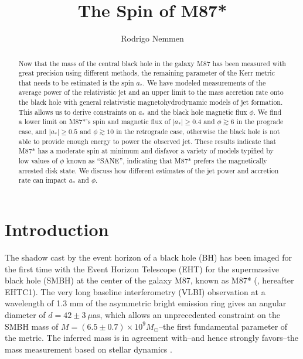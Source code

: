 \documentclass[twocolumn]{aastex62} %
\begin{document}
\title{The Spin of M87*}




\author{Rodrigo Nemmen }
\nocollaboration




\begin{abstract}
Now that the mass of the central black hole in the galaxy M87 has been measured with great precision using different methods, the remaining parameter of the Kerr metric that needs to be estimated is the spin $a_*$. We have modeled measurements of the average power of the relativistic jet and an upper limit to the mass accretion rate onto the black hole with general relativistic magnetohydrodynamic models of jet formation. This allows us to derive constraints on $a_*$ and the black hole magnetic flux $\phi$. We find a lower limit on M87*'s spin and magnetic flux of $|a_*| \geq 0.4$ and $\phi \gtrsim 6$ in the prograde case, and $|a_*| \geq 0.5$ and $\phi \gtrsim 10$ in the retrograde case, otherwise the black hole is not able to provide enough energy to power the observed jet. These results indicate that M87* has a moderate spin at minimum and disfavor a variety of models typified by low values of $\phi$ known as ``SANE'', indicating that M87* prefers the magnetically arrested disk state. We discuss how different estimates of the jet power and accretion rate can impact $a_*$ and $\phi$.
\end{abstract}






\section{Introduction} \label{sec:intro}

The shadow cast by the event horizon of a black hole (BH) has been imaged for the first time with the Event Horizon Telescope (EHT) for the supermassive black hole (SMBH) at the center of the galaxy M87, known as M87* (\citealt{EHTC2019}, hereafter EHTC1). The very long baseline interferometry (VLBI) observation at a wavelength of 1.3 mm of the asymmetric bright emission ring gives an angular diameter of $d=42 \pm 3 \ \mu$as, which allows an unprecedented constraint on the SMBH mass of $M=(6.5 \pm 0.7) \times 10^9 M_\odot$--the first fundamental parameter of the \cite{Kerr1963} metric. The inferred mass is in agreement with--and hence strongly favors--the mass measurement based on stellar dynamics \citep{Gebhardt2011}. 
\end{document}

